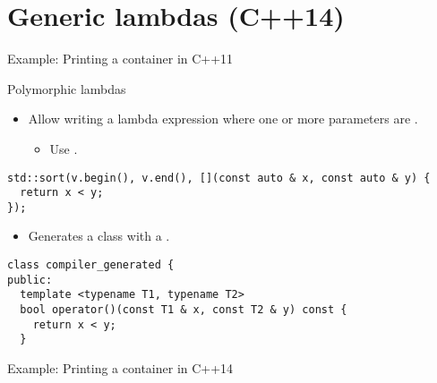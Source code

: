 \section{Generic lambdas (C++14)}

\begin{frame}[t]{Example: Printing a container in C++11}
\end{frame}

\begin{frame}[t,fragile]{Polymorphic lambdas}
\begin{itemize}
  \item Allow writing a lambda expression where one or more parameters are .
    \begin{itemize}
      \item Use .
    \end{itemize}
\end{itemize}
\pause
\begin{lstlisting}
std::sort(v.begin(), v.end(), [](const auto & x, const auto & y) {
  return x < y;
});
\end{lstlisting}

\begin{itemize}
  \item Generates a class with a  .
\end{itemize}
\begin{lstlisting}
class compiler_generated {
public:
  template <typename T1, typename T2>
  bool operator()(const T1 & x, const T2 & y) const {
    return x < y;
  }
\end{lstlisting}
\end{frame}


\begin{frame}[t]{Example: Printing a container in C++14}
\end{frame}
